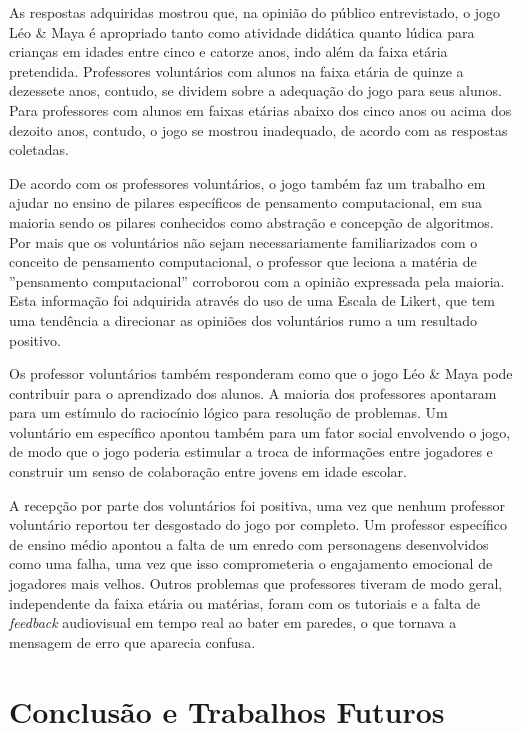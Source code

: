 \documentclass[conference]{IEEEtran}
\begin{document}
As respostas adquiridas mostrou que, na opinião do público entrevistado, o jogo Léo \& Maya é apropriado tanto como atividade didática quanto lúdica para crianças em idades entre cinco e catorze anos, indo além da faixa etária pretendida. Professores voluntários com alunos na faixa etária de quinze a dezessete anos, contudo, se dividem sobre a adequação do jogo para seus alunos. Para professores com alunos em faixas etárias abaixo dos cinco anos ou acima dos dezoito anos, contudo, o jogo se mostrou inadequado, de acordo com as respostas coletadas.

De acordo com os professores voluntários, o jogo também faz um trabalho em ajudar no ensino de pilares específicos de pensamento computacional, em sua maioria sendo os pilares conhecidos como abstração e concepção de algoritmos. Por mais que os voluntários não sejam necessariamente familiarizados com o conceito de pensamento computacional, o professor que leciona a matéria de ''pensamento computacional'' corroborou com a opinião expressada pela maioria. Esta informação foi adquirida através do uso de uma Escala de Likert, que tem uma tendência a direcionar as opiniões dos voluntários rumo a um resultado positivo\cite{b24}.

Os professor voluntários também responderam como que o jogo Léo \& Maya pode contribuir para o aprendizado dos alunos. A maioria dos professores apontaram para um estímulo do raciocínio lógico para resolução de problemas. Um voluntário em específico apontou também para um fator social envolvendo o jogo, de modo que o jogo poderia estimular a troca de informações entre jogadores e construir um senso de colaboração entre jovens em idade escolar.

A recepção por parte dos voluntários foi positiva, uma vez que nenhum professor voluntário reportou ter desgostado do jogo por completo. Um professor específico de ensino médio apontou a falta de um enredo com personagens desenvolvidos como uma falha, uma vez que isso comprometeria o engajamento emocional de jogadores mais velhos. Outros problemas que professores tiveram de modo geral, independente da faixa etária ou matérias, foram com os tutoriais e a falta de \textit{feedback} audiovisual em tempo real ao bater em paredes, o que tornava a mensagem de erro que aparecia confusa.

\section{Conclusão e Trabalhos Futuros}
\end{document}
